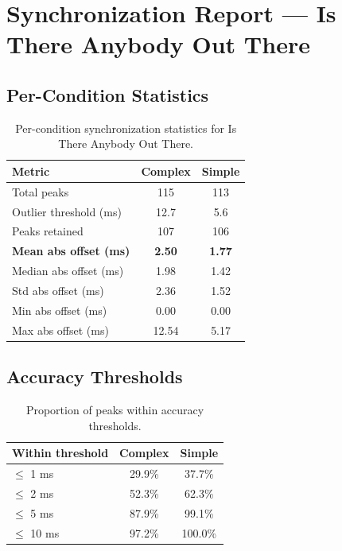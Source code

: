 
\section*{Synchronization Report --- Is There Anybody Out There}

\subsection*{Per-Condition Statistics}

\begin{table}[h!]
\centering
\begin{tabular}{|l|c|c|}
\hline
Metric & Complex & Simple \\
\hline
Total peaks & 115 & 113 \\
Outlier threshold (ms) & 12.7 & 5.6 \\
Peaks retained & 107 & 106 \\
\textbf{Mean abs offset (ms)} & \textbf{2.50} & \textbf{1.77} \\
Median abs offset (ms) & 1.98 & 1.42 \\
Std abs offset (ms) & 2.36 & 1.52 \\
Min abs offset (ms) & 0.00 & 0.00 \\
Max abs offset (ms) & 12.54 & 5.17 \\
\hline
\end{tabular}
\caption{Per-condition synchronization statistics for Is There Anybody Out There.}
\label{tab:sync_stats}
\end{table}

\subsection*{Accuracy Thresholds}

\begin{table}[h!]
\centering
\begin{tabular}{|l|c|c|}
\hline
Within threshold & Complex & Simple \\
\hline
$\leq$ 1 ms & 29.9\% & 37.7\% \\
$\leq$ 2 ms & 52.3\% & 62.3\% \\
$\leq$ 5 ms & 87.9\% & 99.1\% \\
$\leq$ 10 ms & 97.2\% & 100.0\% \\
\hline
\end{tabular}
\caption{Proportion of peaks within accuracy thresholds.}
\label{tab:sync_accuracy}
\end{table}

